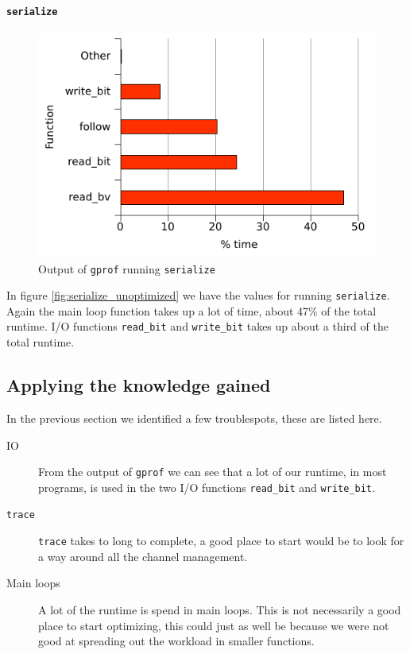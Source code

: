 \paragraph{\texttt{serialize}}
\begin{figure}
  \centering
  \includegraphics{optimizations/serialize_unoptimized.pdf}
  \caption{Output of \texttt{gprof} running \texttt{serialize}}
  \label{fig:serialize_unoptimized}
\end{figure}
In figure \vref{fig:serialize_unoptimized} we have the values for
running \texttt{serialize}. Again the main loop function takes up a
lot of time, about 47\% of the total runtime. I/O functions
\lstinline{read_bit} and \lstinline{write_bit} takes up about a third
of the total runtime.

\subsection{Applying the knowledge gained}

In the previous section we identified a few troublespots, these are
listed here. 
\begin{description}
\item[IO] From the output of \texttt{gprof} we can see that a lot of
  our runtime, in most programs, is used in the two I/O functions
  \lstinline{read_bit} and \lstinline{write_bit}.
\item[\texttt{trace}] \lstinline{trace} takes to long to complete, a
  good place to start would be to look for a way around all the
  channel management.
\item[Main loops] A lot of the runtime is spend in main loops. This is
  not necessarily a good place to start optimizing, this could just as
  well be because we were not good at spreading out the workload in
  smaller functions.
\end{description}



